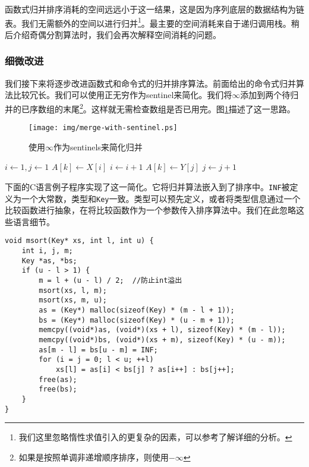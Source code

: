 \documentclass[UTF8]{article}
\begin{document}
函数式归并排序消耗的空间远远小于这一结果，这是因为序列底层的数据结构为链表。我们无需额外的空间以进行归并\footnote{我们这里忽略惰性求值引入的更复杂的因素，可以参考\cite{algo-fp}了解详细的分析。}。最主要的空间消耗来自于递归调用栈。稍后介绍奇偶分割算法时，我们会再次解释空间消耗的问题。

\subsubsection{细微改进}

我们接下来将逐步改进函数式和命令式的归并排序算法。前面给出的命令式归并算法比较冗长。我们可以使用正无穷作为sentinel来简化\cite{CLRS}。我们将$\infty$添加到两个待归并的已序数组的末尾\footnote{如果是按照单调非递增顺序排序，则使用$-\infty$}。这样就无需检查数组是否已用完。图\ref{fig:merge-with-sentinel}描述了这一思路。

\begin{figure}[htbp]
 \centering
 \texttt{[image: img/merge-with-sentinel.ps]}
 \caption{使用$\infty$作为sentinels来简化归并}
 \label{fig:merge-with-sentinel}
\end{figure}

\begin{algorithmic}[1]
  \State {}
  \State {}
  \State $i \gets 1, j\gets 1$
      \State $A[k] \gets X[i]$
      \State $i \gets i + 1$
    \Else
      \State $A[k] \gets Y[j]$
      \State $j \gets j + 1$
    \EndIf
  \EndFor
\EndProcedure
\end{algorithmic}

下面的C语言例子程序实现了这一简化。它将归并算法嵌入到了排序中。\texttt{INF}被定义为一个大常数，类型和\texttt{Key}一致。类型可以预先定义，或者将类型信息通过一个比较函数进行抽象，在将比较函数作为一个参数传入排序算法中。我们在此忽略这些语言细节。

\lstset{language=C}
\begin{lstlisting}
void msort(Key* xs, int l, int u) {
    int i, j, m;
    Key *as, *bs;
    if (u - l > 1) {
        m = l + (u - l) / 2;  //防止int溢出
        msort(xs, l, m);
        msort(xs, m, u);
        as = (Key*) malloc(sizeof(Key) * (m - l + 1));
        bs = (Key*) malloc(sizeof(Key) * (u - m + 1));
        memcpy((void*)as, (void*)(xs + l), sizeof(Key) * (m - l));
        memcpy((void*)bs, (void*)(xs + m), sizeof(Key) * (u - m));
        as[m - l] = bs[u - m] = INF;
        for (i = j = 0; l < u; ++l)
            xs[l] = as[i] < bs[j] ? as[i++] : bs[j++];
        free(as);
        free(bs);
    }
}
\end{lstlisting}
\end{document}
